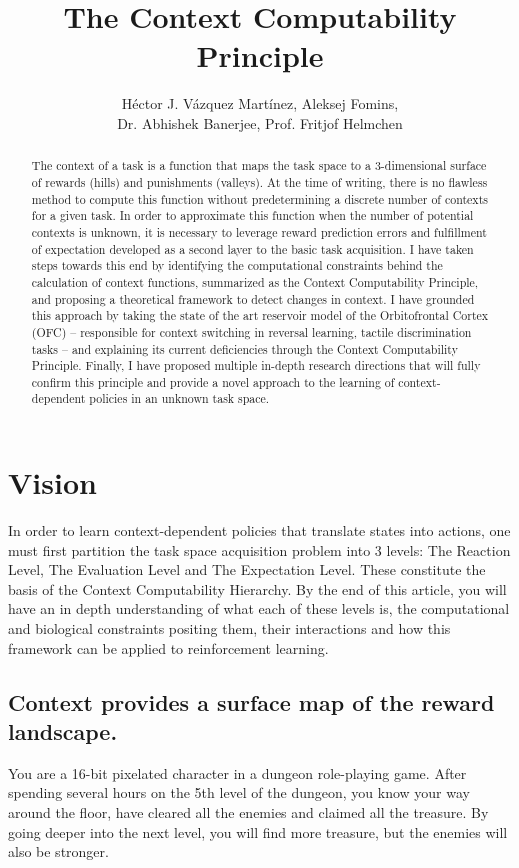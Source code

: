 \documentclass[]{article}
\title{The Context Computability Principle}
\author{H\'ector J. V\'azquez Mart\'inez, Aleksej Fomins,\\
	 Dr. Abhishek Banerjee, Prof. Fritjof Helmchen}
\begin{document}
\maketitle

\begin{abstract}
The context of a task is a function that maps the task space to a 3-dimensional surface of rewards (hills) and punishments (valleys).  At the time of writing, there is no flawless method to compute this function without predetermining a discrete number of contexts for a given task.  In order to approximate this function when the number of potential contexts is unknown, it is necessary to leverage reward prediction errors and fulfillment of expectation developed as a second layer to the basic task acquisition.  I have taken steps towards this end by identifying the computational constraints behind the calculation of context functions, summarized as the Context Computability Principle, and proposing a theoretical framework to detect changes in context.  I have grounded this approach by taking the state of the art reservoir model of the Orbitofrontal Cortex (OFC) -- responsible for context switching in reversal learning, tactile discrimination tasks -- and explaining its current deficiencies through the Context Computability Principle.  Finally, I have proposed multiple in-depth research directions that will fully confirm this principle and provide a novel approach to the learning of context-dependent policies in an unknown task space.
\end{abstract}


\section{Vision}
In order to learn context-dependent policies that translate states into actions, one must first partition the task space acquisition problem into 3 levels: The Reaction Level, The Evaluation Level and The Expectation Level.  These constitute the basis of the Context Computability Hierarchy.  By the end of this article, you will have an in depth understanding of what each of these levels is, the computational and biological constraints positing them, their interactions and how this framework can be applied to reinforcement learning.

\subsection{Context provides a surface map of the reward landscape.}
You are a 16-bit pixelated character in a dungeon role-playing game.  After spending several hours on the 5th level of the dungeon, you know your way around the floor, have cleared all the enemies and claimed all the treasure.  By going deeper into the next level, you will find more treasure, but the enemies will also be stronger.
\end{document}
